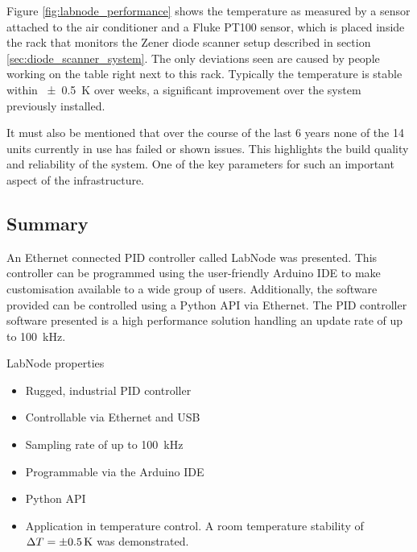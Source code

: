 Figure \ref{fig:labnode_performance} shows the temperature as measured by a sensor attached to the air conditioner and a Fluke  PT100 sensor, which is placed inside the rack that monitors the Zener diode scanner setup described in section \ref{sec:diode_scanner_system}. The only deviations seen are caused by people working on the table right next to this rack. Typically the temperature is stable within \qty{\pm 0.5}{\K} over weeks, a significant improvement over the system previously installed.

It must also be mentioned that over the course of the last \num{6} years none of the \num{14} units currently in use has failed or shown issues. This highlights the build quality and reliability of the system. One of the key parameters for such an important aspect of the infrastructure.

\subsection{Summary}
An Ethernet connected PID controller called LabNode was presented. This controller can be programmed using the user-friendly Arduino IDE to make customisation available to a wide group of users. Additionally, the software provided can be controlled using a Python API via Ethernet. The PID controller software presented is a high performance solution handling an update rate of up to \qty{100}{\kHz}.
\begin{center}
    \begin{deviceProperties}[label={lst:labnode_summary}]{LabNode properties}
    \begin{itemize}
        \item Rugged, industrial PID controller
        \item Controllable via Ethernet and USB
        \item Sampling rate of up to \qty{100}{\kHz}
        \item Programmable via the Arduino IDE
        \item Python API
        \item Application in temperature control. A room temperature stability of $\Delta T = \qty{\pm 0.5}{\kelvin}$ was demonstrated.
    \end{itemize}
    \end{deviceProperties}
\end{center}


